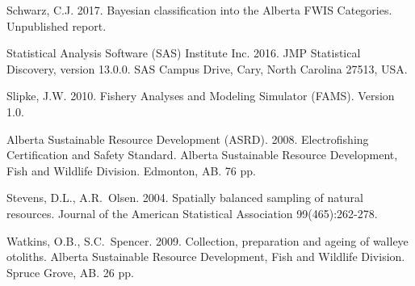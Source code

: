 \documentclass[]{article}\usepackage[]{graphicx}\usepackage[]{color}
\begin{document}
\noindent Schwarz, C.J. 2017. Bayesian classification into the Alberta FWIS Categories.
Unpublished report.

\noindent Statistical Analysis Software (SAS) Institute Inc. 2016. 
JMP Statistical Discovery, version 13.0.0. SAS 
Campus Drive, Cary, North Carolina	27513, USA.

\noindent Slipke, J.W. 2010. Fishery Analyses and Modeling Simulator (FAMS). Version 1.0.

\noindent Alberta Sustainable Resource Development (ASRD). 2008. 
Electrofishing Certification and Safety Standard. 
Alberta Sustainable Resource Development,	Fish and Wildlife Division. Edmonton, AB. 76 pp.

\noindent Stevens, D.L., A.R.\ Olsen. 2004. 
Spatially balanced sampling of natural resources. 
Journal of the American Statistical Association 99(465):262-278.

\noindent Watkins, O.B., S.C.\ Spencer. 2009. 
Collection, preparation and ageing of walleye otoliths. 
Alberta Sustainable Resource Development, Fish and Wildlife Division. 
Spruce Grove, AB. 26 pp.
\end{document}
